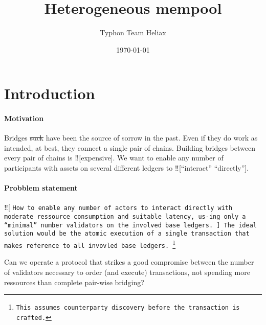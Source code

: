 \documentclass{article}
\title{Heterogeneous mempool \DAG[s]}
\author{Typhon Team Heliax}
\date{\today}
\theoremstyle{definition}
\begin{document}
\renewcommand{\todo}[2][]{}
\maketitle

\tableofcontents
\section{Introduction}

\paragraph{Motivation%
%
}
Bridges%
\st{ suck} %
have been the source of sorrow in the past. 
Even if they do work as intended, 
at best, they connect a single pair of chains. 
Building bridges between every pair of chains
is ‼[expensive]. %
We want to enable
any number of participants with assets on several
different ledgers to ‼[“interact” “directly”].
\todo{explain “interact” “directly”}
\todo[inline]{
  argumentation flaw:
  if we have a base ledger count of~\(n\), 
  we will have a quadratic number of chimera chains as well,
  i.e., (at least) one learner for each chimera chain. 
}
\paragraph{Probblem statement%
}
‼[
\tt How to enable any number of actors to interact directly
with moderate ressource consumption and suitable latency, 
us-ing only a “minimal” number validators on the involved base ledgers.
%
]
The ideal solution would be 
the atomic execution of a single transaction that
makes reference to all invovled base ledgers.%
\footnote{%
  This assumes counterparty discovery 
  before the transaction  is crafted.
}%
\xspace
Can we operate a protocol
that strikes a good compromise between
the number of validators necessary to order (and execute) transactions,
not spending more ressources than complete pair-wise bridging?
\end{document}
